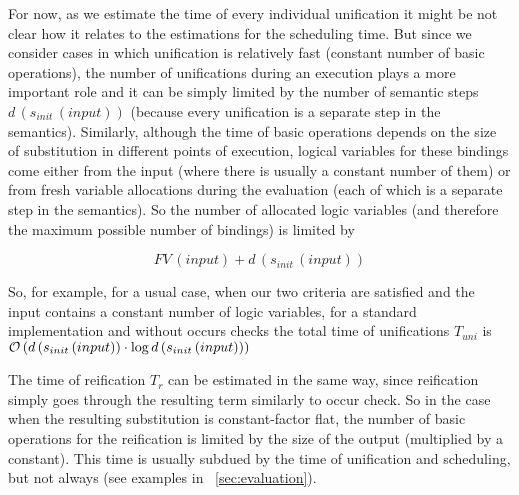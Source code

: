 For now, as we estimate the time of every individual unification it might be not clear how it relates to the estimations for the scheduling time. But since we consider cases in which unification
is relatively fast (constant number of basic operations), the number of unifications during an execution plays a more important role and it can be simply limited by the number of semantic
steps $d\,(s_{init}\,(input))$ (because every unification is a separate step in the semantics). Similarly, although the time of basic operations depends on the size of substitution in different points
of execution, logical variables for these bindings come either from the input (where there is usually a constant number of them) or from fresh variable allocations during the evaluation
(each of which is a separate step in the semantics). So the number of allocated logic variables (and therefore the maximum possible number of bindings) is limited by

\[
FV\,(input) + d\,(s_{init}\,(input))
\]

So, for example, for a usual case, when our two criteria are satisfied and the input contains a constant number of logic variables, for a standard implementation and without occurs checks
the total time of unifications $T_{uni}$ is $\mathcal{O}\,(d\,(s_{init}\,(input))\cdot \log d\,(s_{init}\,(input)))$

The time of reification $T_r$ can be estimated in the same way, since reification simply goes through the resulting term similarly to occur check. So in the case when the resulting
substitution is constant-factor flat, the number of basic operations for the reification is limited by the size of the output (multiplied by a constant). This time is usually subdued by
the time of unification and scheduling, but not always (see examples in \sectionword~\ref{sec:evaluation}).
